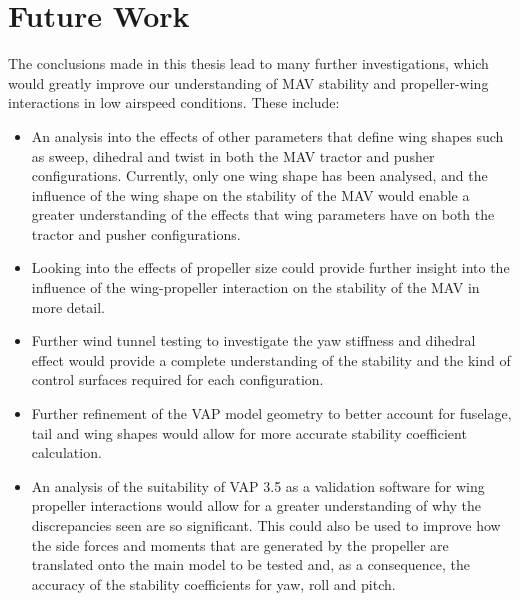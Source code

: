 \section{Future Work}
The conclusions made in this thesis lead to many further investigations, which would greatly improve our understanding of \acrshort{MAV} stability and propeller-wing interactions in low airspeed conditions. These include:

\begin{itemize}
    \item An analysis into the effects of other parameters that define wing shapes such as sweep, dihedral and twist in both the \acrshort{MAV} tractor and pusher configurations. Currently, only one wing shape has been analysed, and the influence of the wing shape on the stability of the MAV would enable a greater understanding of the effects that wing parameters have on both the tractor and pusher configurations. 

    \item Looking into the effects of propeller size could provide further insight into the influence of the wing-propeller interaction on the stability of the MAV in more detail. 


    \item Further wind tunnel testing to investigate the yaw stiffness and dihedral effect would provide a complete understanding of the stability and the kind of control surfaces required for each configuration.

    \item Further refinement of the VAP model geometry to better account for fuselage, tail and wing shapes would allow for more accurate stability coefficient calculation.
    
    \item An analysis of the suitability of VAP 3.5 as a validation software for wing propeller interactions would allow for a greater understanding of why the discrepancies seen are so significant. This could also be used to improve how the side forces and moments that are generated by the propeller are translated onto the main model to be tested and, as a consequence, the accuracy of the stability coefficients for yaw, roll and pitch.

    
\end{itemize}
